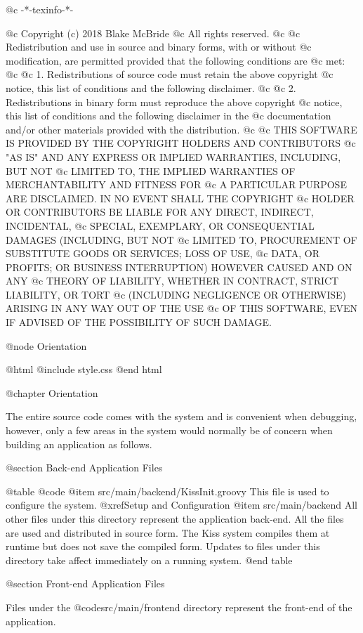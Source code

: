 @c -*-texinfo-*-

@c  Copyright (c) 2018 Blake McBride
@c  All rights reserved.
@c
@c  Redistribution and use in source and binary forms, with or without
@c  modification, are permitted provided that the following conditions are
@c  met:
@c
@c  1. Redistributions of source code must retain the above copyright
@c  notice, this list of conditions and the following disclaimer.
@c
@c  2. Redistributions in binary form must reproduce the above copyright
@c  notice, this list of conditions and the following disclaimer in the
@c  documentation and/or other materials provided with the distribution.
@c
@c  THIS SOFTWARE IS PROVIDED BY THE COPYRIGHT HOLDERS AND CONTRIBUTORS
@c  "AS IS" AND ANY EXPRESS OR IMPLIED WARRANTIES, INCLUDING, BUT NOT
@c  LIMITED TO, THE IMPLIED WARRANTIES OF MERCHANTABILITY AND FITNESS FOR
@c  A PARTICULAR PURPOSE ARE DISCLAIMED. IN NO EVENT SHALL THE COPYRIGHT
@c  HOLDER OR CONTRIBUTORS BE LIABLE FOR ANY DIRECT, INDIRECT, INCIDENTAL,
@c  SPECIAL, EXEMPLARY, OR CONSEQUENTIAL DAMAGES (INCLUDING, BUT NOT
@c  LIMITED TO, PROCUREMENT OF SUBSTITUTE GOODS OR SERVICES; LOSS OF USE,
@c  DATA, OR PROFITS; OR BUSINESS INTERRUPTION) HOWEVER CAUSED AND ON ANY
@c  THEORY OF LIABILITY, WHETHER IN CONTRACT, STRICT LIABILITY, OR TORT
@c  (INCLUDING NEGLIGENCE OR OTHERWISE) ARISING IN ANY WAY OUT OF THE USE
@c  OF THIS SOFTWARE, EVEN IF ADVISED OF THE POSSIBILITY OF SUCH DAMAGE.


@node Orientation

@html
@include style.css
@end html

@chapter Orientation


The entire source code comes with the system and is convenient when
debugging, however, only a few areas in the system would normally be
of concern when building an application as follows.


@section Back-end Application Files

@table @code
@item src/main/backend/KissInit.groovy
This file is used to configure the system. @xref{Setup and Configuration}
@item src/main/backend
All other files under this directory represent the application
back-end.  All the files are used and distributed in source form.  The
Kiss system compiles them at runtime but does not save the compiled form.
Updates to files under this directory take affect
immediately on a running system.
@end table


@section Front-end Application Files

Files under the @code{src/main/frontend} directory represent the
front-end of the application.

